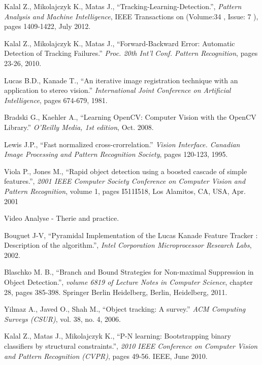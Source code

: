 \newpage{}

\begin{thebibliography}{SMAT}
 Kalal Z., Mikolajczyk K., Matas J., ``Tracking-Learning-Detection.'', \textit{Pattern Analysis and Machine Intelligence}, IEEE Transactions on (Volume:34 , Issue: 7 ), pages 1409-1422, July 2012.

 Kalal Z., Mikolajczyk K., Matas J., ``Forward-Backward Error: Automatic Detection of Tracking Failures.'' \textit{Proc. 20th Int'l Conf. Pattern Recognition}, pages 23-26, 2010.

 Lucas B.D., Kanade T., ``An iterative image registration technique with an application to stereo vision.'' \textit{International Joint Conference on Artificial Intelligence}, pages 674-679, 1981.

 Bradski G., Kaehler A., ``Learning OpenCV: Computer Vision with the OpenCV Library.''\textit{ O\textquoteright{}Reilly Media, 1st edition}, Oct. 2008.

 Lewis J.P., ``Fast normalized cross-crorrelation.'' \textit{Vision Interface. Canadian Image Processing and Pattern Recognition Society}, pages 120-123, 1995.

 Viola P., Jones M., ``Rapid object detection using a boosted cascade of simple features.'', \textit{2001 IEEE Computer Society Conference on Computer Vision and Pattern Recognition}, volume 1, pages I\textendash{}511\textendash{}I\textendash{}518, Los Alamitos, CA, USA, Apr. 2001

 Video Analyse - Therie and practice.

 Bouguet J-V, ``Pyramidal Implementation of the Lucas Kanade Feature Tracker : Description of the algorithm.'', \textit{Intel Corporation \textendash{} Microprocessor Research Labs}, 2002.

 Blaschko M. B., ``Branch and Bound Strategies for Non-maximal Suppression in Object Detection.'', \textit{volume 6819 of Lecture Notes in Computer Science}, chapter 28, pages 385-398. Springer Berlin Heidelberg, Berlin, Heidelberg, 2011.

 Yilmaz A., Javed O., Shah M., ``Object tracking: A survey.'' \textit{ACM Computing Surveys (CSUR)}, vol. 38, no. 4, 2006.

Kalal Z., Matas J., Mikolajczyk K., ``P-N learning: Bootstrapping binary classifiers by structural constraints.'', \textit{2010 IEEE Conference on Computer Vision and Pattern Recognition (CVPR)}, pages 49-56. IEEE, June 2010.


\end{thebibliography}
